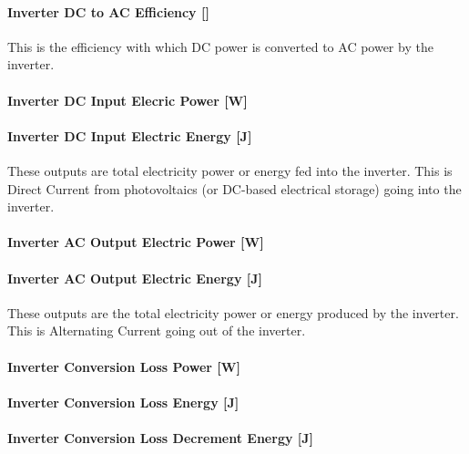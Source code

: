 \paragraph{Inverter DC to AC Efficiency {[]}}\label{inverter-dc-to-ac-efficiency}

This is the efficiency with which DC power is converted to AC power by the inverter.

\paragraph{Inverter DC Input Elecric Power {[}W{]}}\label{inverter-dc-input-elecric-power-w}

\paragraph{Inverter DC Input Electric Energy {[}J{]}}\label{inverter-dc-input-electric-energy-j}

These outputs are total electricity power or energy fed into the inverter. This is Direct Current from photovoltaics (or DC-based electrical storage) going into the inverter.

\paragraph{Inverter AC Output Electric Power {[}W{]}}\label{inverter-ac-output-electric-power-w}

\paragraph{Inverter AC Output Electric Energy {[}J{]}}\label{inverter-ac-output-electric-energy-j}

These outputs are the total electricity power or energy produced by the inverter. This is Alternating Current going out of the inverter.

\paragraph{Inverter Conversion Loss Power {[}W{]}}\label{inverter-conversion-loss-power-w}

\paragraph{Inverter Conversion Loss Energy {[}J{]}}\label{inverter-conversion-loss-energy-j}

\paragraph{Inverter Conversion Loss Decrement Energy {[}J{]}}\label{inverter-conversion-loss-decrement-energy-j}

